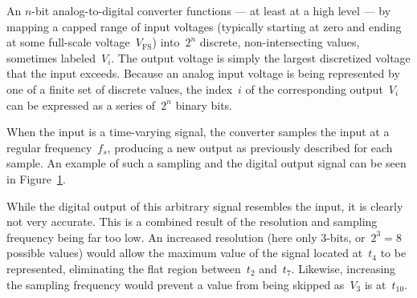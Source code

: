 An $n$-bit analog-to-digital converter functions --- at least at a high level
--- by mapping a capped range of input voltages (typically starting at zero and ending
at some full-scale voltage~$V_\text{FS}$) into~$2^n$ discrete, non-intersecting
values, sometimes labeled~$V_i$.  The output voltage is simply the largest
discretized voltage that the input exceeds.  Because an analog input voltage is
being represented by one of a finite set of discrete values, the index~$i$ of
the corresponding output~$V_i$ can be expressed as a series of~$2^n$ binary
bits.

When the input is a time-varying signal, the converter samples the input
at a regular frequency~$f_s$, producing a new output as previously described
for each sample.  An example of such a sampling and the digital output signal
can be seen in Figure~\ref{fig:theory}.
%
\begin{figure}[H]
	\centering
	\caption{}
	\label{fig:theory}
\end{figure}
%
While the digital output of this arbitrary signal resembles the input, it is
clearly not very accurate.  This is a combined result of the resolution and
sampling frequency being far too low.  An increased resolution (here only
3-bits, or~$2^3 = 8$ possible values) would allow the maximum value of the
signal located at~$t_4$ to be represented, eliminating the flat region
between~$t_2$ and~$t_7$.  Likewise, increasing the sampling frequency would
prevent a value from being skipped as~$V_3$ is at~$t_{10}$.

\begin{figure}[H]
	\centering
	
\end{figure}

